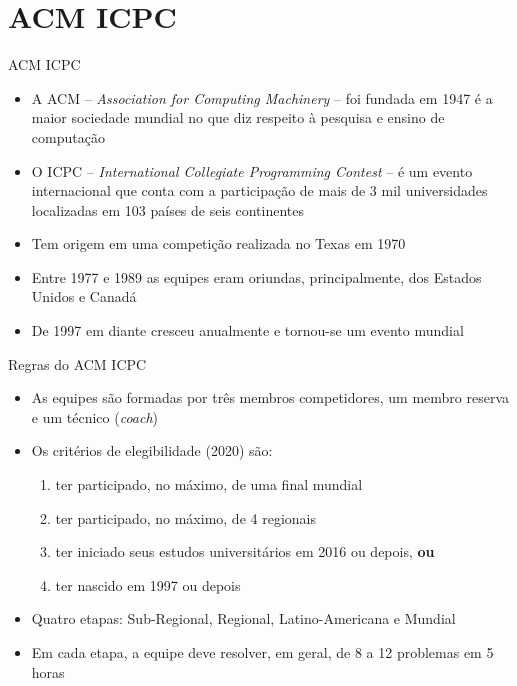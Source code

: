 \section{ACM ICPC}

\begin{frame}[fragile]{ACM ICPC}

    \begin{itemize}
        \item A ACM -- \textit{Association for Computing Machinery} -- foi fundada em 1947 é 
        a maior sociedade mundial no que diz respeito à pesquisa e ensino de computação
        \item O ICPC -- \textit{International Collegiate Programming Contest} -- é um evento
        internacional que conta com a participação de mais de 3 mil universidades localizadas em
        103 países de seis continentes
        \item Tem origem em uma competição realizada no Texas em 1970
        \item Entre 1977 e 1989 as equipes eram oriundas, principalmente, dos Estados Unidos e Canadá
        \item De 1997 em diante cresceu anualmente e tornou-se um evento mundial
    \end{itemize}

\end{frame}

\begin{frame}[fragile]{Regras do ACM ICPC}

    \begin{itemize}
        \item As equipes são formadas por três membros competidores, um membro reserva e um 
        técnico (\textit{coach})
        \item Os critérios de elegibilidade (2020) são:
            \begin{enumerate}
                \item ter participado, no máximo, de uma final mundial
                \item ter participado, no máximo, de 4 regionais
                \item ter iniciado seus estudos universitários em 2016 ou depois, \textbf{ou} 
                \item ter nascido em 1997 ou depois
            \end{enumerate}
        \item Quatro etapas: Sub-Regional, Regional, Latino-Americana e Mundial
        \item Em cada etapa, a equipe deve resolver, em geral, de 8 a 12 problemas em 5 horas
    \end{itemize}

\end{frame}

